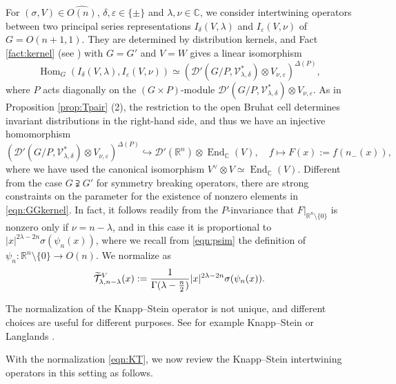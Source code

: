 For $(\sigma,V)\in \widehat{O(n)}$, 
 $\delta, \varepsilon \in \{ \pm \}$
 and $\lambda,\nu \in {\mathbb{C}}$, 
 we consider intertwining operators between two principal series representations 
 $I_{\delta}(V,\lambda)$
 and $I_{\varepsilon}(V,\nu)$
 of $G=O(n+1,1)$.  
They are determined by distribution kernels,
 and Fact \ref{fact:kernel}
 (see \cite[Prop.~3.2]{sbon}) with $G=G'$ and $V=W$ 
 gives a linear isomorphism
\begin{equation}
\label{eqn:GGkernel}
  {\operatorname{Hom}}_G(I_{\delta}(V,\lambda), I_{\varepsilon}(V,\nu))
  \simeq
  ({\mathcal{D}}'(G/P, {\mathcal{V}}_{\lambda, \delta}^{\ast})
  \otimes 
  V_{\nu, \varepsilon})^{\Delta(P)}, 
\end{equation}
 where $P$ acts diagonally
 on the $(G \times P)$-module
 ${\mathcal{D}}'(G/P, {\mathcal{V}}_{\lambda,\delta}^{\ast})
  \otimes V_{\nu,\varepsilon}$.  
As in Proposition \ref{prop:Tpair} (2), 
 the restriction to the open Bruhat cell 
 determines invariant distributions 
 in the right-hand side, 
 and thus we have an injective homomorphism
\[
  ({\mathcal{D}}'(G/P, {\mathcal{V}}_{\lambda,\delta}^{\ast})
   \otimes 
   V_{\nu,\varepsilon})^{\Delta(P)}
  \hookrightarrow
  {\mathcal{D}}'({\mathbb{R}}^n)\otimes {\operatorname{End}}_{\mathbb{C}}(V), 
  \quad
  f \mapsto F(x):=f(n_-(x)), 
\]
where we have used the canonical isomorphism
 $V^{\vee} \otimes V \simeq {\operatorname{End}}_{\mathbb{C}}(V)$.  
Different from the case $G \supsetneqq G'$
 for symmetry breaking operators, 
 there are strong constraints
 on the parameter
 for the existence of nonzero elements
 in \eqref{eqn:GGkernel}.  
In fact,
 it follows readily from the $P$-invariance
 that $F|_{{\mathbb{R}}^n \setminus \{0\}}$ is nonzero
 only if $\nu=n-\lambda$, 
 and in this case it is proportional
 to $|x|^{2 \lambda-2n} \sigma(\psi_n(x))$, 
 where we recall from \eqref{eqn:psim} the definition
 of $\psi_n \colon {\mathbb{R}}^n \setminus \{0\} \to O(n)$.  
We normalize as 
\begin{equation}
\label{eqn:KT}
\widetilde{\mathcal{T}}_{{\lambda},{n-\lambda}}^{{V}}(x)
:=
 \frac{1}{\Gamma(\lambda-\frac n 2)}
|x|^{2\lambda-2n} \sigma(\psi_n(x)).  
\end{equation}

\begin{remark}
The normalization of the Knapp--Stein operator
 is not unique,
 and different choices are useful
 for different purposes.  
See for example Knapp--Stein \cite{KS} or Langlands \cite{LLNM}.  
\end{remark}
With the normalization \eqref{eqn:KT},
 we now review the Knapp--Stein intertwining operators
 in this setting as follows.  



